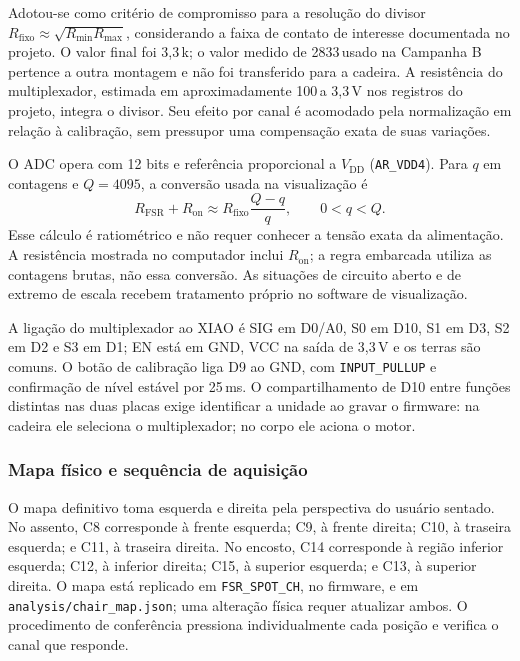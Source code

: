 Adotou-se como critério de compromisso para a resolução do divisor
$R_{\mathrm{fixo}}\approx\sqrt{R_{\min}R_{\max}}$, considerando a faixa
de contato de interesse documentada no projeto. O valor final foi
3{,}3\,k\ohm; o valor medido de 2833\,\ohm usado na Campanha B
pertence a outra montagem e não foi transferido para a cadeira. A
resistência do multiplexador, estimada em aproximadamente
100\,\ohm a 3{,}3\,V nos registros do projeto, integra o divisor.
Seu efeito por canal é acomodado pela normalização em relação à
calibração, sem pressupor uma compensação exata de suas variações.

O ADC opera com 12 bits e referência proporcional a $V_{\mathrm{DD}}$
(\texttt{AR\_VDD4}). Para $q$ em contagens e $Q=4095$, a conversão
usada na visualização é
\begin{equation}
 R_{\mathrm{FSR}}+R_{\mathrm{on}}\approx
 R_{\mathrm{fixo}}\frac{Q-q}{q},\qquad 0<q<Q.
 \label{eq:met-resistencia}
\end{equation}
Esse cálculo é ratiométrico e não requer conhecer a tensão exata da
alimentação. A resistência mostrada no computador inclui
$R_{\mathrm{on}}$; a regra embarcada utiliza as contagens brutas, não
essa conversão. As situações de circuito aberto e de extremo de escala
recebem tratamento próprio no software de visualização.

A ligação do multiplexador ao XIAO é SIG em D0/A0, S0 em D10, S1 em D3,
S2 em D2 e S3 em D1; EN está em GND, VCC na saída de 3{,}3\,V e os
terras são comuns. O botão de calibração liga D9 ao GND, com
\texttt{INPUT\_PULLUP} e confirmação de nível estável por 25\,ms.
O compartilhamento de D10 entre funções distintas nas duas placas
exige identificar a unidade ao gravar o firmware: na cadeira ele
seleciona o multiplexador; no corpo ele aciona o motor.

\subsubsection{Mapa físico e sequência de aquisição}

O mapa definitivo toma esquerda e direita pela perspectiva do usuário
sentado. No assento, C8 corresponde à frente esquerda; C9, à frente
direita; C10, à traseira esquerda; e C11, à traseira direita. No encosto,
C14 corresponde à região inferior esquerda; C12, à inferior direita;
C15, à superior esquerda; e C13, à superior direita. O mapa está
replicado em \texttt{FSR\_SPOT\_CH}, no firmware, e em
\texttt{analysis/chair\_map.json}; uma alteração física requer atualizar
ambos. O procedimento de conferência pressiona individualmente cada
posição e verifica o canal que responde.


